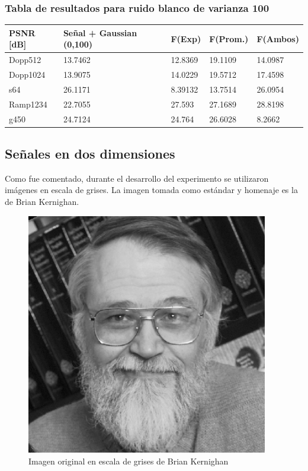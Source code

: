 \subsubsection{Tabla de resultados para ruido blanco de varianza 100}

\begin{table}[H]
        \begin{tabular}{|l|llll|}
                \hline
                \textbf{PSNR [dB]} & Se\~nal + Gaussian (0,100) & F(Exp) & F(Prom.) & F(Ambos) \\ \hline
                    Dopp512 & 13.7462 & 12.8369 & 19.1109 & 14.0987 \\
                    Dopp1024 & 13.9075 & 14.0229 & 19.5712 & 17.4598 \\
                    s64 & 26.1171 & 8.39132 & 13.7514 & 26.0954 \\
                    Ramp1234 & 22.7055 & 27.593 & 27.1689 & 28.8198 \\
                    g450 & 24.7124 & 24.764 & 26.6028 & 8.2662 \\ \hline
                    \end{tabular}
                \end{table}


\newpage

        \subsection{Se\~nales en dos dimensiones}

Como fue comentado, durante el desarrollo del experimento se utilizaron
im\'agenes en escala de grises. La imagen tomada como est\'andar y homenaje es 
la de Brian Kernighan.

\begin{figure}[H]
\begin {center}
\includegraphics[width=299pt]{imagenes/brian_kernighan.png}
\end {center}
\caption{Imagen original en escala de grises de Brian Kernighan}
\label{fig:SinProm}
\end{figure}

